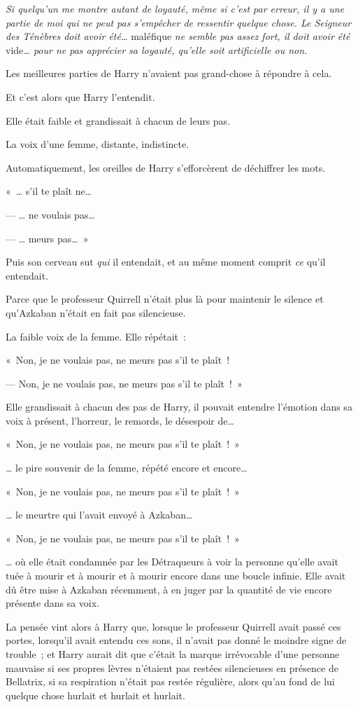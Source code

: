 \emph{Si quelqu'un me montre autant de loyauté, même si c'est par erreur, il y a une partie de moi qui ne peut pas s'empêcher de ressentir quelque chose. Le Seigneur des Ténèbres doit avoir été…} maléfique \emph{ne semble pas assez fort, il doit avoir été} vide\emph{… pour ne pas apprécier sa loyauté, qu'elle soit artificielle ou non.}

Les meilleures parties de Harry n'avaient pas grand-chose à répondre à cela.

Et c'est alors que Harry l'entendit.

Elle était faible et grandissait à chacun de leurs pas.

La voix d'une femme, distante, indistincte.

Automatiquement, les oreilles de Harry s'efforcèrent de déchiffrer les mots.

«~… s'il te plaît ne…

--- … ne voulais pas…

--- … meurs pas…~»

Puis son cerveau sut \emph{qui} il entendait, et au même moment comprit \emph{ce} qu'il entendait.

Parce que le professeur Quirrell n'était plus là pour maintenir le silence et qu'Azkaban n'était en fait pas silencieuse.

La faible voix de la femme. Elle répétait~:

«~Non, je ne voulais pas, ne meurs pas s'il te plaît~!

--- Non, je ne voulais pas, ne meurs pas s'il te plaît~!~»

Elle grandissait à chacun des pas de Harry, il pouvait entendre l'émotion dans sa voix à présent, l'horreur, le remords, le désespoir de…

«~Non, je ne voulais pas, ne meurs pas s'il te plaît~!~»

… le pire souvenir de la femme, répété encore et encore…

«~Non, je ne voulais pas, ne meurs pas s'il te plaît~!~»

… le meurtre qui l'avait envoyé à Azkaban…

«~Non, je ne voulais pas, ne meurs pas s'il te plaît~!~»

… où elle était condamnée par les Détraqueurs à voir la personne qu'elle avait tuée à mourir et à mourir et à mourir encore dans une boucle infinie. Elle avait dû être mise à Azkaban récemment, à en juger par la quantité de vie encore présente dans sa voix.

La pensée vint alors à Harry que, lorsque le professeur Quirrell avait passé ces portes, lorsqu'il avait entendu ces sons, il n'avait pas donné le moindre signe de trouble~; et Harry aurait dit que c'était la marque irrévocable d'une personne mauvaise si ses propres lèvres n'étaient pas restées silencieuses en présence de Bellatrix, si sa respiration n'était pas restée régulière, alors qu'au fond de lui quelque chose hurlait et hurlait et hurlait.

